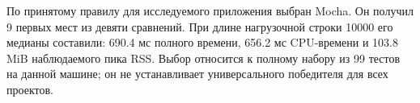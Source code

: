 По принятому правилу для исследуемого приложения выбран Mocha. Он получил 9 первых мест из девяти сравнений. При длине нагрузочной строки 10000 его медианы составили: 690.4 мс полного времени, 656.2 мс CPU-времени и 103.8 MiB наблюдаемого пика RSS. Выбор относится к полному набору из 99 тестов на данной машине; он не устанавливает универсального победителя для всех проектов.
